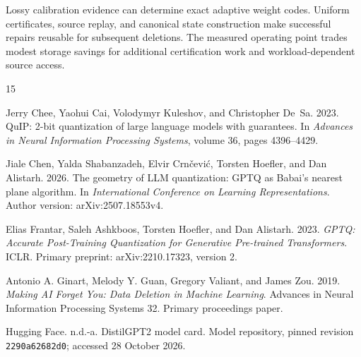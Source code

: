 \documentclass[11pt,a4paper]{article}
\makeatletter
\def\href#1#2{{#2}}
\def\section{\@startsection {section}{1}{\z@}{-2.0ex plus
    -0.5ex minus -.2ex}{1.5ex plus 0.3ex minus .2ex}{\large\bf\raggedright}}
\makeatother
\begin{document}
\section{Conclusion}
Lossy calibration evidence can determine exact adaptive weight codes. Uniform
certificates, source replay, and canonical state construction make successful
repairs reusable for subsequent deletions. The measured operating point trades
modest storage savings for additional certification work and workload-dependent
source access.
\label{page:main-end}
\clearpage
\begin{thebibliography}{15}

Jerry Chee, Yaohui Cai, Volodymyr Kuleshov, and Christopher De~Sa. 2023.
\href{https://proceedings.neurips.cc/paper_files/paper/2023/hash/0df38cd13520747e1e64e5b123a78ef8-Abstract-Conference.html}{QuIP: 2-bit quantization of large language models with guarantees}.
In \emph{Advances in Neural Information Processing Systems}, volume 36, pages 4396--4429.

Jiale Chen, Yalda Shabanzadeh, Elvir Crn\v{c}evi\'{c}, Torsten Hoefler, and Dan Alistarh. 2026.
\href{https://arxiv.org/abs/2507.18553v4}{The geometry of LLM quantization: GPTQ as Babai's nearest plane algorithm}.
In \emph{International Conference on Learning Representations}. Author version: arXiv:2507.18553v4.

Elias Frantar, Saleh Ashkboos, Torsten Hoefler, and Dan Alistarh.
2023. \emph{GPTQ: Accurate Post-Training Quantization for Generative Pre-trained
Transformers}. ICLR. Primary preprint:
\href{https://arxiv.org/abs/2210.17323v2}{arXiv:2210.17323, version 2}.

Antonio A. Ginart, Melody Y. Guan, Gregory Valiant, and James Zou.
2019. \emph{Making AI Forget You: Data Deletion in Machine Learning}.
Advances in Neural Information Processing Systems 32.
\href{https://papers.nips.cc/paper_files/paper/2019/file/cb79f8fa58b91d3af6c9c991f63962d3-Paper.pdf}{Primary proceedings paper}.

Hugging Face. n.d.-a.
\href{https://huggingface.co/distilbert/distilgpt2/blob/2290a62682d06624634c1f46a6ad5be0f47f38aa/README.md}{DistilGPT2 model card}.
Model repository, pinned revision \nolinkurl{2290a62682d0}; accessed 28 October 2026.


\end{thebibliography}
\end{document}
